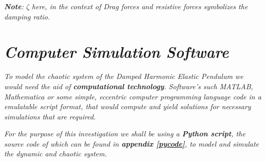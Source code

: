     \textit{\textbf{Note}: $\zeta$ here, in the context of Drag forces and resistive forces symbolizes the damping ratio.}
            
\section{\textit{Computer Simulation Software}}
        
    \textit{To model the chaotic system of the Damped Harmonic Elastic Pendulum we would need the aid of \textbf{computational technology}. Software's such MATLAB, Mathematica or some simple, eccentric computer programming language code in a emulatable script format, that would compute and yield solutions for necessary simulations that are required.}
    
    \textit{For the purpose of this investigation we shall be using a \textbf{Python script}, the source code of which can be found in \textbf{appendix \ref{pycode}}, to model and simulate the dynamic and chaotic system.}
        
        


